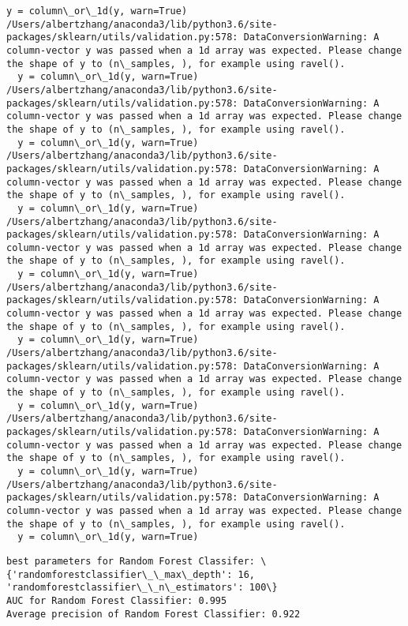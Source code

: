 \documentclass[11pt]{article}
\begin{document}
\begin{Verbatim}[commandchars=\\\{\}]
  y = column\_or\_1d(y, warn=True)
/Users/albertzhang/anaconda3/lib/python3.6/site-packages/sklearn/utils/validation.py:578: DataConversionWarning: A column-vector y was passed when a 1d array was expected. Please change the shape of y to (n\_samples, ), for example using ravel().
  y = column\_or\_1d(y, warn=True)
/Users/albertzhang/anaconda3/lib/python3.6/site-packages/sklearn/utils/validation.py:578: DataConversionWarning: A column-vector y was passed when a 1d array was expected. Please change the shape of y to (n\_samples, ), for example using ravel().
  y = column\_or\_1d(y, warn=True)
/Users/albertzhang/anaconda3/lib/python3.6/site-packages/sklearn/utils/validation.py:578: DataConversionWarning: A column-vector y was passed when a 1d array was expected. Please change the shape of y to (n\_samples, ), for example using ravel().
  y = column\_or\_1d(y, warn=True)
/Users/albertzhang/anaconda3/lib/python3.6/site-packages/sklearn/utils/validation.py:578: DataConversionWarning: A column-vector y was passed when a 1d array was expected. Please change the shape of y to (n\_samples, ), for example using ravel().
  y = column\_or\_1d(y, warn=True)
/Users/albertzhang/anaconda3/lib/python3.6/site-packages/sklearn/utils/validation.py:578: DataConversionWarning: A column-vector y was passed when a 1d array was expected. Please change the shape of y to (n\_samples, ), for example using ravel().
  y = column\_or\_1d(y, warn=True)
/Users/albertzhang/anaconda3/lib/python3.6/site-packages/sklearn/utils/validation.py:578: DataConversionWarning: A column-vector y was passed when a 1d array was expected. Please change the shape of y to (n\_samples, ), for example using ravel().
  y = column\_or\_1d(y, warn=True)
/Users/albertzhang/anaconda3/lib/python3.6/site-packages/sklearn/utils/validation.py:578: DataConversionWarning: A column-vector y was passed when a 1d array was expected. Please change the shape of y to (n\_samples, ), for example using ravel().
  y = column\_or\_1d(y, warn=True)
/Users/albertzhang/anaconda3/lib/python3.6/site-packages/sklearn/utils/validation.py:578: DataConversionWarning: A column-vector y was passed when a 1d array was expected. Please change the shape of y to (n\_samples, ), for example using ravel().
  y = column\_or\_1d(y, warn=True)

    \end{Verbatim}

    \begin{Verbatim}[commandchars=\\\{\}]
best parameters for Random Forest Classifer: \{'randomforestclassifier\_\_max\_depth': 16, 'randomforestclassifier\_\_n\_estimators': 100\}
AUC for Random Forest Classifier: 0.995
Average precision of Random Forest Classifier: 0.922

    \end{Verbatim}
\end{document}
